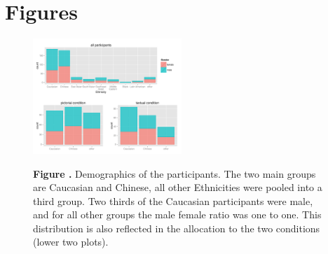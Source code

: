 \documentclass{frontiersSCNS} %
\begin{document}
\section*{Figures}





\begin{figure}[h!]
\begin{center}
\includegraphics[width=0.5\textwidth]{figures/participants.pdf}
\end{center}
\textbf{\label{fig:01} Figure .}{ Demographics of the participants. The two main groups are Caucasian and Chinese, all other Ethnicities were pooled into a third group. Two thirds of the Caucasian participants were male, and for all other groups the male female ratio was one to one. This distribution is also reflected in the allocation to the two conditions (lower two plots).}
   \label{fig:demographics}
\end{figure}
\end{document}
